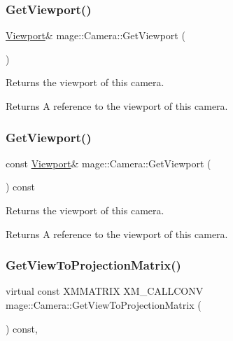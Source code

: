 \subsubsection{\texorpdfstring{Get\+Viewport()}{GetViewport()}\hspace{0.1cm}{\footnotesize\ttfamily [1/2]}}
{\footnotesize\ttfamily \hyperlink{classmage_1_1_viewport}{Viewport}\& mage\+::\+Camera\+::\+Get\+Viewport (\begin{DoxyParamCaption}{ }\end{DoxyParamCaption})\hspace{0.3cm}{\ttfamily [noexcept]}}

Returns the viewport of this camera.

\begin{DoxyReturn}{Returns}
A reference to the viewport of this camera. 
\end{DoxyReturn}
\hypertarget{classmage_1_1_camera_afe08e4f43e57608f8bd45f3fefc89d47}{}\label{classmage_1_1_camera_afe08e4f43e57608f8bd45f3fefc89d47} 
\subsubsection{\texorpdfstring{Get\+Viewport()}{GetViewport()}\hspace{0.1cm}{\footnotesize\ttfamily [2/2]}}
{\footnotesize\ttfamily const \hyperlink{classmage_1_1_viewport}{Viewport}\& mage\+::\+Camera\+::\+Get\+Viewport (\begin{DoxyParamCaption}{ }\end{DoxyParamCaption}) const\hspace{0.3cm}{\ttfamily [noexcept]}}

Returns the viewport of this camera.

\begin{DoxyReturn}{Returns}
A reference to the viewport of this camera. 
\end{DoxyReturn}
\hypertarget{classmage_1_1_camera_a716d842481321b8b4d71da45ab77a7c9}{}\label{classmage_1_1_camera_a716d842481321b8b4d71da45ab77a7c9} 
\subsubsection{\texorpdfstring{Get\+View\+To\+Projection\+Matrix()}{GetViewToProjectionMatrix()}}
{\footnotesize\ttfamily virtual const X\+M\+M\+A\+T\+R\+IX X\+M\+\_\+\+C\+A\+L\+L\+C\+O\+NV mage\+::\+Camera\+::\+Get\+View\+To\+Projection\+Matrix (\begin{DoxyParamCaption}{ }\end{DoxyParamCaption}) const\hspace{0.3cm}{\ttfamily [pure virtual]}, {\ttfamily [noexcept]}}

